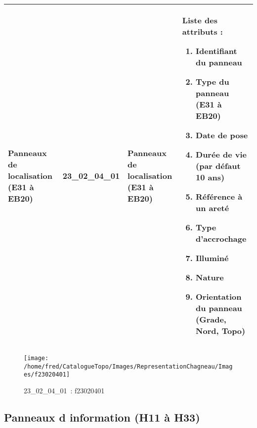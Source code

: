 \documentclass[12pt,titlepage]{book}
\begin{document}
\renewcommand{\arraystretch}{1.2}
\begin{supertabular}{|p{10cm}|c|p{13cm}|p{12cm}|}
 Panneaux de localisation (E31 à EB20) & 23\_02\_04\_01 & Panneaux de localisation (E31 à EB20) & Liste des attributs :
\begin{enumerate}
  \item Identifiant du panneau  \item Type du panneau (E31 à EB20)  \item Date de pose  \item Durée de vie (par défaut 10 ans)  \item Référence à un areté  \item Type d'accrochage  \item Illuminé  \item Nature  \item Orientation du panneau (Grade, Nord, Topo)\end{enumerate}
\\
\hline
\end{supertabular}
\begin{figure}[h!]
  \hfill         %
  \begin{minipage}[t]{3cm}
    \begin{center}
      \texttt{[image: /home/fred/CatalogueTopo/Images/RepresentationChagneau/Images/f23020401]}
      \caption[~23\_02\_04\_01]{\small{23\_02\_04\_01~:} \tiny{f23020401}}\label{f23020401}
    \end{center}
  \end{minipage}
\end{figure}


\subsection{Panneaux d information (H11 à H33)}
\noindent
\vspace{\baselineskip}
\end{document}
